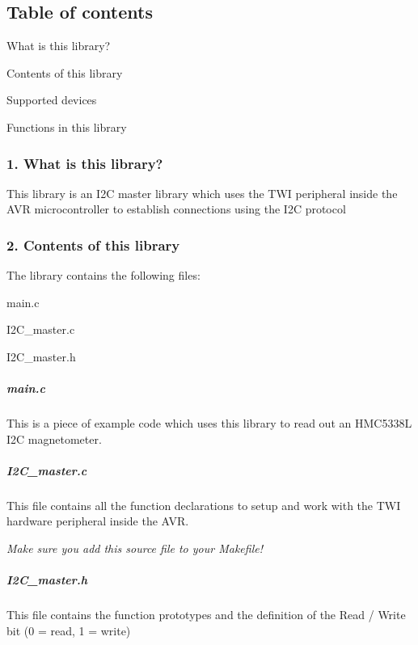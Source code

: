 \subsection*{Table of contents}


\begin{DoxyEnumerate}
\item What is this library?
\item Contents of this library
\item Supported devices
\item Functions in this library 


\end{DoxyEnumerate}

\subsubsection*{1. What is this library?}

This library is an I2C master library which uses the T\+WI peripheral inside the A\+VR microcontroller to establish connections using the I2C protocol 



\subsubsection*{2. Contents of this library}

The library contains the following files\+:


\begin{DoxyItemize}
\item main.\+c
\item I2\+C\+\_\+master.\+c
\item I2\+C\+\_\+master.\+h
\end{DoxyItemize}

\subparagraph*{main.\+c}

This is a piece of example code which uses this library to read out an H\+M\+C5338L I2C magnetometer.

\subparagraph*{I2\+C\+\_\+master.\+c}

This file contains all the function declarations to setup and work with the T\+WI hardware peripheral inside the A\+VR.

{\itshape Make sure you add this source file to your Makefile!}

\subparagraph*{I2\+C\+\_\+master.\+h}

This file contains the function prototypes and the definition of the Read / Write bit (0 = read, 1 = write)

